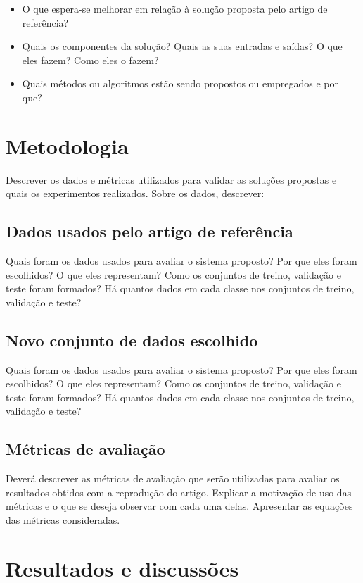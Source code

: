 \documentclass[conference]{IEEEtran}
\begin{document}
\begin{itemize}
    \item O que espera-se melhorar em relação à solução proposta pelo artigo de referência?
    \item Quais os componentes da solução? Quais as suas entradas e saídas? O que eles fazem? Como eles o fazem?
    \item Quais métodos ou algoritmos estão sendo propostos ou empregados e por que?
\end{itemize}

\section{Metodologia}

Descrever os dados e métricas utilizados para validar as soluções propostas e quais os experimentos realizados. Sobre os dados, descrever:

\subsection{Dados usados pelo artigo de referência}

Quais foram os dados usados para avaliar o sistema proposto? Por que eles foram escolhidos? O que eles representam? Como os conjuntos de treino, validação e teste foram formados? Há quantos dados em cada classe nos conjuntos de treino, validação e teste?

\subsection{Novo conjunto de dados escolhido}

Quais foram os dados usados para avaliar o sistema proposto? Por que eles foram escolhidos? O que eles representam? Como os conjuntos de treino, validação e teste foram formados? Há quantos dados em cada classe nos conjuntos de treino, validação e teste?

\subsection{Métricas de avaliação}

Deverá descrever as métricas de avaliação que serão utilizadas para avaliar os resultados obtidos com a reprodução do artigo. Explicar a motivação de uso das métricas e o que se deseja observar com cada uma delas. Apresentar as equações das métricas consideradas.

\section{Resultados e discussões}
\end{document}
